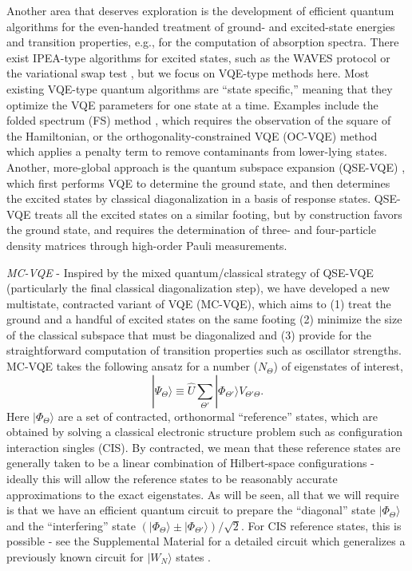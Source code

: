 \documentclass[aps,prl,twocolumn,showpacs,superscriptaddress,groupedaddress]{revtex4}  %
\begin{document}
Another area that deserves exploration is the development of efficient quantum
algorithms for the even-handed treatment of ground- and excited-state energies
and transition properties, e.g., for the computation of absorption spectra.
There exist IPEA-type algorithms for excited states, such as the WAVES protocol
\cite{Santagati:2018:eaap9646} or the variational swap test \cite{Endo:2018:X},
but we focus on VQE-type methods here. Most existing VQE-type quantum algorithms
are ``state specific,'' meaning that they optimize the VQE parameters for one
state at a time. Examples include the folded spectrum (FS) method
\cite{Peruzzo:2014:4213}, which requires the observation of the square of the
Hamiltonian, or the orthogonality-constrained VQE (OC-VQE) method
\cite{Higgott:2018:X,Lee:2018:JCTC} which applies a penalty term to remove
contaminants from lower-lying states. Another, more-global approach is the
quantum subspace expansion (QSE-VQE)
\cite{McClean:2017:042308,Colless:2018:011021}, which first performs VQE to
determine the ground state, and then determines the excited states by classical
diagonalization in a basis of response states.  QSE-VQE treats all the excited
states on a similar footing, but by construction favors the ground state, and
requires the determination of three- and four-particle density matrices through
high-order Pauli measurements.

\textit{MC-VQE} - Inspired by the mixed quantum/classical strategy of QSE-VQE
(particularly the final classical diagonalization step), we have developed a new
multistate, contracted variant of VQE (MC-VQE), which aims to (1) treat the
ground and a handful of excited states on the same footing (2) minimize the size
of the classical subspace that must be diagonalized and (3) provide for the
straightforward computation of transition properties such as oscillator
strengths. MC-VQE takes the following ansatz for a number ($N_{\Theta}$) of
eigenstates of interest,
\begin{equation}
\label{eq:vqe}
|\Psi_{\Theta} \rangle
\equiv
\hat U 
\sum_{\Theta'}
| \Phi_{\Theta'} \rangle
V_{\Theta' \Theta}
.
\end{equation}
Here $| \Phi_{\Theta} \rangle$ are a set of contracted, orthonormal
``reference'' states, which are obtained by solving a classical electronic
structure problem such as configuration interaction singles (CIS). By
contracted, we mean that these reference states are generally taken to be a
linear combination of Hilbert-space configurations - ideally this will allow the
reference states to be reasonably accurate approximations to the exact
eigenstates. As will be seen, all that we will require is that we have an
efficient quantum circuit to prepare the ``diagonal'' state $|\Phi_{\Theta}
\rangle$ and the ``interfering'' state $(|\Phi_{\Theta} \rangle \pm
|\Phi_{\Theta'} \rangle) / \sqrt{2}$. For CIS reference states, this is possible
- see the Supplemental Material for a detailed circuit \cite{SuppNote} which
  generalizes a previously known circuit for $|W_N\rangle$ states
\cite{Diker:2016:W}.
\end{document}
